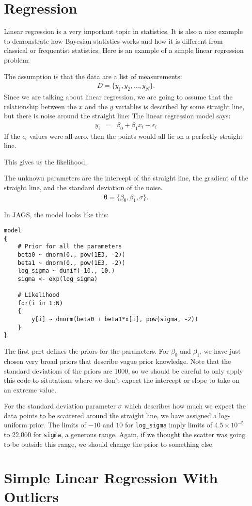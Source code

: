 \chapter{Regression}
Linear regression is a very important topic in statistics. It is also a nice
example to demonstrate how Bayesian statistics works and how it is different
from classical or frequentist statistics. Here is an example of a simple linear
regression problem:






The assumption is that the data are a list of measurements:
\begin{eqnarray}
D = \{y_1, y_2, ..., y_N\}.
\end{eqnarray}
Since we are talking about linear regression, we are going to assume that the
relationship between the $x$ and the $y$ variables is described by some
straight line, but there is noise around the straight line:
The linear regression model says:
\begin{eqnarray}
y_i &=& \beta_0 + \beta_1 x_i + \epsilon_i
\end{eqnarray}
If the $\epsilon_i$ values were all zero, then the points would all lie on
a perfectly straight line.

This gives us the likelihood.

The unknown parameters are the intercept of the straight line, the gradient of
the straight line, and the standard deviation of the noise.
\begin{eqnarray}
\boldsymbol{\theta} = \{\beta_0, \beta_1, \sigma\}.
\end{eqnarray}

In JAGS, the model looks like this:
\begin{verbatim}
model
{
    # Prior for all the parameters
    beta0 ~ dnorm(0., pow(1E3, -2))
    beta1 ~ dnorm(0., pow(1E3, -2))
    log_sigma ~ dunif(-10., 10.)
    sigma <- exp(log_sigma)

    # Likelihood
    for(i in 1:N)
    {
        y[i] ~ dnorm(beta0 + beta1*x[i], pow(sigma, -2))
    }
}
\end{verbatim}
The first part defines the priors for the parameters. For $\beta_0$ and $\beta_1$,
we have just chosen very broad priors that describe vague prior knowledge. Note
that the standard deviations of the priors are 1000, so we should be careful
to only apply this code to situtations where we don't expect the intercept or
slope to take on an extreme value.

For the standard deviation parameter $\sigma$ which describes how much we
expect the data points to be scattered around the straight line, we have assigned
a log-uniform prior. The limits of $-10$ and $10$ for {\tt log\_sigma} imply
limits of $4.5 \times 10^{-5}$ to 22,000 for {\tt sigma}, a generous range.
Again, if we thought the scatter
was going to be outside this range, we should change the prior to something
else.



\chapter{Simple Linear Regression With Outliers}

